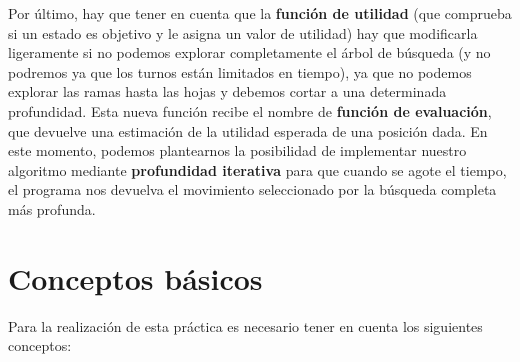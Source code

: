 Por último, hay que tener en cuenta que la \textbf{función de utilidad} (que
comprueba si un estado es objetivo y le asigna un valor de utilidad)
hay que modificarla ligeramente si no podemos explorar completamente
el árbol de búsqueda (y no podremos ya que los turnos están limitados
en tiempo), ya que no podemos explorar las ramas hasta las hojas y
debemos cortar a una determinada profundidad. Esta nueva función
recibe el nombre de \textbf{función de evaluación}, que devuelve una estimación
de la utilidad esperada de una posición dada. En este momento, podemos
plantearnos la posibilidad de implementar nuestro algoritmo mediante
\textbf{profundidad iterativa} para que cuando se agote el tiempo, el programa
nos devuelva el movimiento seleccionado por la búsqueda completa más
profunda.

\section{Conceptos básicos}
Para la realización de esta práctica es necesario tener en cuenta los
siguientes conceptos:
